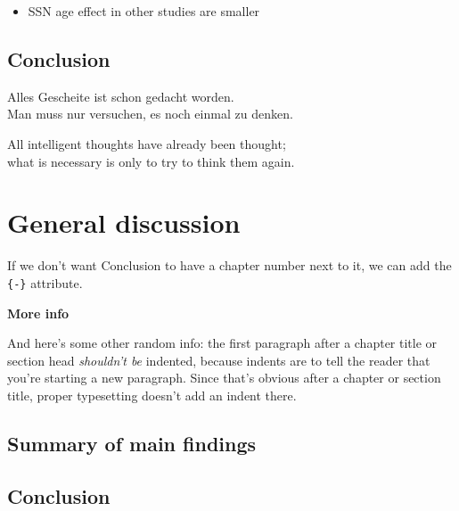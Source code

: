 \documentclass[a4paper, twoside]{templates/ociamthesis}
\providecommand{\tightlist}{%
  \setlength{\itemsep}{0pt}\setlength{\parskip}{0pt}}
\begin{document}
\begin{itemize}
\tightlist
\item
  SSN age effect in other studies are smaller
\end{itemize}

\hypertarget{conclusion-2}{%
\section{Conclusion}\label{conclusion-2}}

\clearpage

\begin{savequote}
Alles Gescheite ist schon gedacht worden.\\
Man muss nur versuchen, es noch einmal zu denken.

All intelligent thoughts have already been thought;\\
what is necessary is only to try to think them again.
\end{savequote}



\hypertarget{general-discussion}{%
\chapter*{General discussion}\label{general-discussion}}

If we don't want Conclusion to have a chapter number next to it, we can add the \texttt{\{-\}} attribute.

\textbf{More info}

And here's some other random info: the first paragraph after a chapter title or section head \emph{shouldn't be} indented, because indents are to tell the reader that you're starting a new paragraph. Since that's obvious after a chapter or section title, proper typesetting doesn't add an indent there.

\hypertarget{summary-of-main-findings}{%
\section*{Summary of main findings}\label{summary-of-main-findings}}

\hypertarget{conclusion-3}{%
\section*{Conclusion}\label{conclusion-3}}
\end{document}
